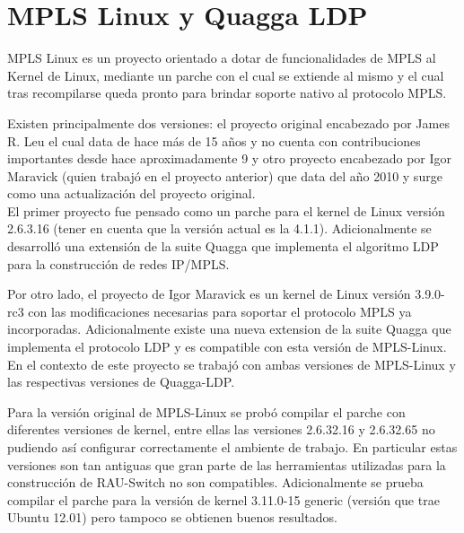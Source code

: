 \newpage
\section{MPLS Linux y Quagga LDP}
\label{apendiceB6}

MPLS Linux es un proyecto orientado a dotar de funcionalidades de MPLS al Kernel de Linux, mediante un parche con el cual se extiende al mismo y el cual tras recompilarse queda pronto para brindar soporte nativo al protocolo MPLS. %

Existen principalmente dos versiones: el proyecto original\cite{MplsLinux1} encabezado por James R. Leu el cual data de hace m\'as de 15 a\~nos y no cuenta con contribuciones importantes desde hace aproximadamente 9 y otro proyecto\cite{MplsLinux2} encabezado por Igor Maravick (quien trabaj\'o en el proyecto anterior) que data del a\~no 2010 y surge como una actualizaci\'on del proyecto original.\\

El primer proyecto fue pensado como un parche para el kernel de Linux versi\'on 2.6.3.16 (tener en cuenta que la versi\'on actual es la 4.1.1). Adicionalmente se desarroll\'o una extensión de la suite Quagga\cite{QuaggaLDP1} que implementa el algoritmo LDP para la construcci\'on de redes IP/MPLS.

Por otro lado, el proyecto de Igor Maravick es un kernel de Linux versi\'on 3.9.0-rc3 con las modificaciones necesarias para soportar el protocolo MPLS ya incorporadas. Adicionalmente existe una nueva extension de la suite Quagga que implementa el protocolo LDP \cite{QuaggaLDP2} y es compatible con esta versi\'on de MPLS-Linux.\\

En el contexto de este proyecto se trabaj\'o con ambas versiones de MPLS-Linux y las respectivas versiones de Quagga-LDP. 

Para la versi\'on original de MPLS-Linux se prob\'o compilar el parche con diferentes versiones de kernel, entre ellas las versiones 2.6.32.16 y 2.6.32.65 no pudiendo as\'i configurar correctamente el ambiente de trabajo. En particular estas versiones son tan antiguas que gran parte de las herramientas utilizadas para la construcci\'on de RAU-Switch no son compatibles. Adicionalmente se prueba compilar el parche para la versi\'on de kernel 3.11.0-15 generic (versi\'on que trae Ubuntu 12.01) pero tampoco se obtienen buenos resultados.\\

